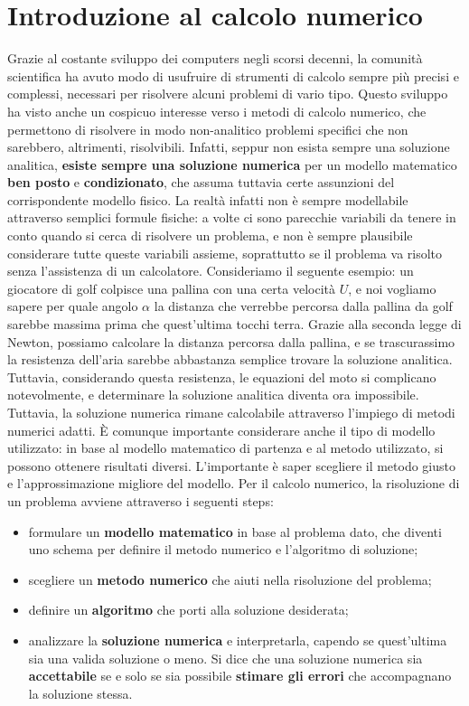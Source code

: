 \chapter{Introduzione al calcolo numerico}

Grazie al costante sviluppo dei computers negli scorsi decenni, la comunità scientifica ha avuto modo di usufruire di strumenti di calcolo sempre più precisi e complessi, necessari per risolvere alcuni problemi di vario tipo. Questo sviluppo ha visto anche un cospicuo interesse verso i metodi di calcolo numerico, che permettono di risolvere in modo non-analitico problemi specifici che non sarebbero, altrimenti, risolvibili. Infatti, seppur non esista sempre una soluzione analitica, \textbf{esiste sempre una soluzione numerica} per un modello matematico \textbf{ben posto} e \textbf{condizionato}, che assuma tuttavia certe assunzioni del corrispondente modello fisico.
\nl
La realtà infatti non è sempre modellabile attraverso semplici formule fisiche: a volte ci sono parecchie variabili da tenere in conto quando si cerca di risolvere un problema, e non è sempre plausibile considerare tutte queste variabili assieme, soprattutto se il problema va risolto senza l'assistenza di un calcolatore. Consideriamo il seguente esempio: un giocatore di golf colpisce una pallina con una certa velocità $U$, e noi vogliamo sapere per quale angolo $\alpha$ la distanza che verrebbe percorsa dalla pallina da golf sarebbe massima prima che quest'ultima tocchi terra.
\nl
Grazie alla seconda legge di Newton, possiamo calcolare la distanza percorsa dalla pallina, e se trascurassimo la resistenza dell'aria sarebbe abbastanza semplice trovare la soluzione analitica. Tuttavia, considerando questa resistenza, le equazioni del moto si complicano notevolmente, e determinare la soluzione analitica diventa ora impossibile. Tuttavia, la soluzione numerica rimane calcolabile attraverso l'impiego di metodi numerici adatti.
\nl
È comunque importante considerare anche il tipo di modello utilizzato: in base al modello matematico di partenza e al metodo utilizzato, si possono ottenere risultati diversi. L'importante è saper scegliere il metodo giusto e l'approssimazione migliore del modello.
\nl
Per il calcolo numerico, la risoluzione di un problema avviene attraverso i seguenti steps:
\begin{itemize}
    \item formulare un \textbf{modello matematico} in base al problema dato, che diventi uno schema per definire il metodo numerico e l'algoritmo di soluzione;
    \item scegliere un \textbf{metodo numerico} che aiuti nella risoluzione del problema;
    \item definire un \textbf{algoritmo} che porti alla soluzione desiderata;
    \item analizzare la \textbf{soluzione numerica} e interpretarla, capendo se quest'ultima sia una valida soluzione o meno. Si dice che una soluzione numerica sia \textbf{accettabile} se e solo se sia possibile \textbf{stimare gli errori} che accompagnano la soluzione stessa.
\end{itemize}

